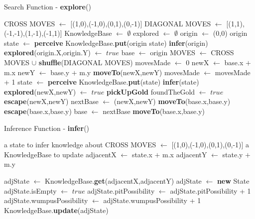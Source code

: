 \documentclass[11pt,a4paper]{article}
\begin{document}
\begin{algorithm}
\caption{Search Function - \textbf{explore}()}
\label{explore}
\begin{algorithmic}[1]
\REQUIRE CROSS MOVES $\leftarrow$ [(1,0),(-1,0),(0,1),(0,-1)]
\REQUIRE DIAGONAL MOVES $\leftarrow$ [(1,1),(-1,-1),(1,-1),(-1,1)]
\STATE KnowledgeBase $\leftarrow$ $\emptyset$
\STATE explored $\leftarrow$ $\emptyset$
\STATE
\STATE origin $\leftarrow$ (0,0)
\STATE origin state $\leftarrow$ \textbf{perceive}
\STATE KnowledgeBase.\textbf{put}(origin state)
\STATE \textbf{infer}(origin)
\STATE \textbf{explored}(origin.X,origin.Y) $\leftarrow$ $true$
\STATE base $\leftarrow$ origin
\STATE
\LOOP
\STATE MOVES $\leftarrow$ CROSS MOVES $\cup$ \textbf{shuffle}(DIAGONAL MOVES)
\STATE movesMade $\leftarrow$ 0
\STATE newX $\leftarrow$ base.x $+$ m.x 
\STATE newY $\leftarrow$ base.y $+$ m.y
\STATE \textbf{moveTo}(newX,newY)
\STATE movesMade $\leftarrow$ movesMade + 1
\STATE state $\leftarrow$ \textbf{perceive}
\STATE KnowledgeBase.\textbf{put}(state)
\STATE \textbf{infer}(state)
\STATE \textbf{explored}(newX,newY) $\leftarrow$ $true$
\STATE \textbf{pickUpGold}
\STATE foundTheGold $\leftarrow$ $true$
\STATE \textbf{escape}(newX,newY)
\ENDIF
{}
\STATE nextBase $\leftarrow$ (newX,newY)
\ENDIF
\STATE \textbf{moveTo}(base.x,base.y)
\ENDIF
\ENDFOR
{}
\STATE \textbf{escape}(base.x,base.y)
\ENDIF
\STATE base $\leftarrow$ nextBase
\STATE \textbf{moveTo}(base.x,base.y)
\ENDLOOP
\end{algorithmic}
\end{algorithm}

\newpage

\begin{algorithm}
\caption{Inference Function - \textbf{infer}()}
\label{infer}
\begin{algorithmic}[1]
\REQUIRE a state to infer knowledge about
\REQUIRE CROSS MOVES $\leftarrow$ [(1,0),(-1,0),(0,1),(0,-1)]
\REQUIRE a KnowledgeBase to update
\STATE adjacentX $\leftarrow$ state.x $+$ m.x 
\STATE adjacentY $\leftarrow$ state.y $+$ m.y

\STATE adjState $\leftarrow$ KnowledgeBase.\textbf{get}(adjacentX,adjacentY)
\ELSE
\STATE adjState $\leftarrow$ \textbf{new} State
\ENDIF
\STATE
{}
\STATE adjState.isEmpty $\leftarrow$ $true$
\ELSE
{}
\STATE adjState.pitPossibility $\leftarrow$ adjState.pitPossibility + 1
\ENDIF
{}
\STATE adjState.wumpusPossibility $\leftarrow$ adjState.wumpusPossibility + 1
\ENDIF
\ENDIF
\STATE KnowledgeBase.\textbf{update}(adjState)
\ENDFOR
\end{algorithmic}
\end{algorithm}
\end{document}

